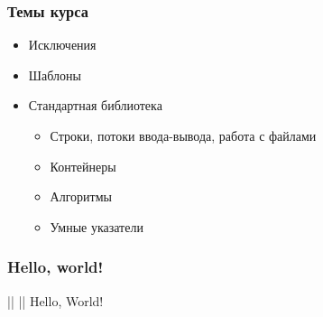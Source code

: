 \documentclass[compress]{beamer}
\begin{document}
\begin{frame}

    \frametitle{Темы курса}

    \begin{itemize}

        \item Исключения

        \item Шаблоны

        \item Стандартная библиотека

            \begin{itemize}

                \item Строки, потоки ввода-вывода, работа с файлами

                \item Контейнеры

                \item Алгоритмы

                \item Умные указатели

            \end{itemize}

    \end{itemize}

\end{frame}

\begin{frame}[fragile]

    \frametitle{Hello, world!}


    \begin{consolewindow}[\footnotesize]
||
||
Hello, World!
    \end{consolewindow}

\end{frame}
\end{document}
